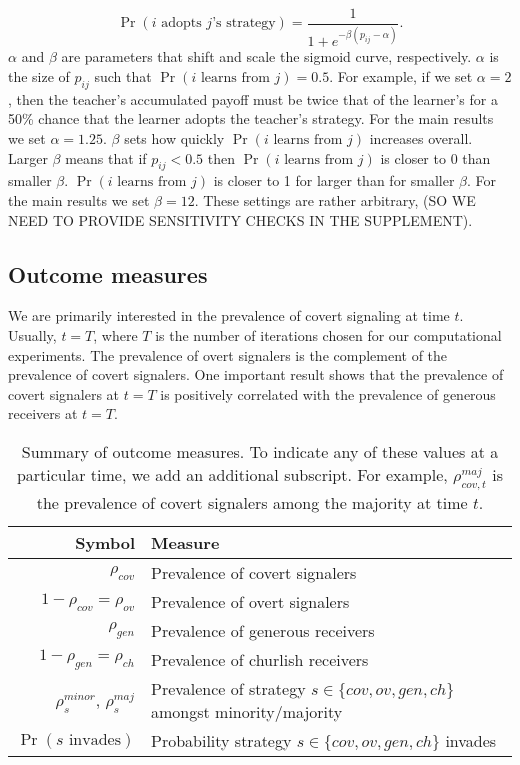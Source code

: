 \documentclass[11pt,letterpaper]{article}
\begin{document}
\begin{equation}
  \Pr(\text{$i$ adopts $j$'s strategy}) = \frac{1}{1 + e^{-\beta(p_{ij} - \alpha)}}.
\end{equation}
\noindent
$\alpha$ and $\beta$ are parameters that shift and scale the sigmoid curve, respectively. 
$\alpha$ is the size of $p_{ij}$ such that $\Pr(\text{$i$ learns from $j$}) = 0.5$. %
For example, if we set $\alpha = 2$, then the teacher's accumulated payoff
must be twice that of the learner's for a 50\% chance that the learner 
adopts the teacher's strategy. 
For the main results we set $\alpha=1.25$. $\beta$ sets how quickly 
$\Pr(\text{$i$ learns from $j$})$ increases overall. Larger $\beta$ means that
if $p_{ij} < 0.5$ then $\Pr(\text{$i$ learns from $j$})$ is closer to 0 than smaller $\beta$. 
$\Pr(\text{$i$ learns from $j$})$ is closer to 1 for larger than for smaller $\beta$. For the main
results we set $\beta = 12$. These settings are rather arbitrary, (SO WE NEED
TO PROVIDE SENSITIVITY CHECKS IN THE SUPPLEMENT).

\subsection{Outcome measures}

We are primarily interested in the prevalence of covert signaling at time
$t$. Usually, $t=T$, where $T$ is the number of iterations chosen for our 
computational experiments. The prevalence of overt signalers is the complement 
of the prevalence of covert signalers. One important result shows that the
prevalence of covert signalers at $t=T$ is positively correlated with the
prevalence of generous receivers at $t=T$.  

\begin{table}[H]
  \centering
  \begin{tabular}{rp{3in}} %
    Symbol & Measure \\ %
    \toprule
      $\rho_{cov}$ & Prevalence of covert signalers\\
    $1 - \rho_{cov} = \rho_{ov}$ & Prevalence of overt signalers  \\
     $\rho_{gen}$ & Prevalence of generous receivers \\
    $1 - \rho_{gen} = \rho_{ch}$ & Prevalence of churlish receivers \\
    $\rho_s^{minor}$, $\rho_s^{maj}$ & Prevalence of strategy $s \in \{cov, ov, gen, ch\}$ amongst minority/majority \\
    $\Pr(\text{$s$ invades})$ & Probability strategy $s \in \{cov, ov, gen, ch\}$ invades 
  \end{tabular}
  \caption{Summary of outcome measures. To indicate any of these values at
  a particular time, we add an additional subscript. For example, $\rho_{cov,t}^{maj}$
  is the prevalence of covert signalers among the majority at time $t$.}
  \label{tab:outcomeMeasures}
\end{table}
\end{document}
